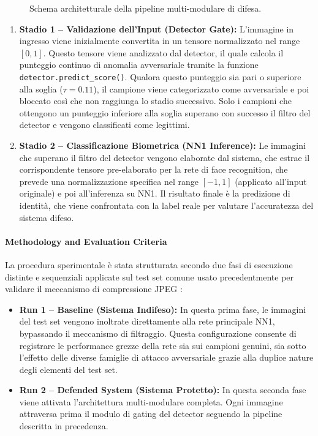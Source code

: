 \documentclass[a4paper, 12pt]{article}
\begin{document}
\begin{figure}[htbp]
{\begin{tikzpicture}
    \end{tikzpicture}
    }
    \caption{Schema architetturale della pipeline multi-modulare di difesa.}
    \label{fig:pipeline_architetturale}
\end{figure}

\begin{enumerate}
    \item \textbf{Stadio 1 -- Validazione dell'Input (Detector Gate):} L'immagine in ingresso viene inizialmente convertita in un 
    tensore normalizzato nel range $[0, 1]$. Questo tensore viene analizzato dal detector, il quale calcola il punteggio continuo di 
    anomalia avversariale tramite la funzione \texttt{detector.predict\_score()}. Qualora questo punteggio sia pari o superiore alla 
    soglia ($\tau = 0.11$), il campione viene categorizzato come avversariale e poi bloccato così che non raggiunga lo stadio successivo.
    Solo i campioni che ottengono un punteggio inferiore alla  soglia superano con successo il filtro del detector e vengono 
    classificati come legittimi.
    \item \textbf{Stadio 2 -- Classificazione Biometrica (NN1 Inference):} Le immagini che superano il filtro del detector 
    vengono elaborate dal sistema, che estrae il corrispondente tensore pre-elaborato per la rete di face 
    recognition, che prevede una normalizzazione specifica nel range $[-1, 1]$ (applicato all'input originale) e poi all'inferenza su NN1. 
    Il risultato finale è la predizione di identità, che viene confrontata con la label reale per valutare l'accuratezza del sistema 
    difeso.
\end{enumerate}


\vspace{10pt}

\paragraph{Methodology and Evaluation Criteria}

La procedura sperimentale è stata strutturata secondo due
fasi di esecuzione distinte e sequenziali applicate sul test set comune usato precedentmente per validare il meccanismo 
di compressione JPEG :

\begin{itemize}
    \item \textbf{Run 1 -- Baseline (Sistema Indifeso):} In questa prima fase, le immagini del test set 
    vengono inoltrate direttamente alla rete principale NN1, bypassando il meccanismo di filtraggio. 
    Questa configurazione consente di registrare le performance grezze della rete 
    sia sui campioni genuini, sia sotto l'effetto delle diverse famiglie di attacco avversariale grazie 
    alla duplice nature degli elementi del test set.
    \item \textbf{Run 2 -- Defended System (Sistema Protetto):} In questa seconda fase viene attivata 
    l'architettura multi-modulare completa. Ogni immagine attraversa prima il modulo di 
    gating del detector seguendo la pipeline descritta in precedenza.
\end{itemize}
\end{document}
